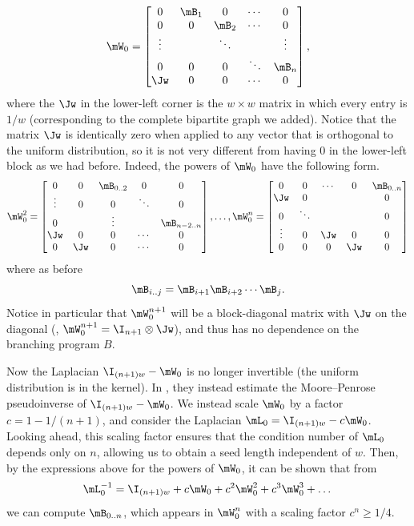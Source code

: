     \begin{equation}
        \mW_0 =
    \begin{bmatrix}
    0 & \mB_1 & 0 & \cdots & 0 \\
    0 & 0 & \mB_2 & \cdots & 0 \\
    \vdots & & \ddots & & \vdots\\
    0 & 0 & 0 & \ddots & \mB_n\\
    \Jw & 0 & 0 & \cdots &  0 \\
    \end{bmatrix}, \label{eqn:bWhat}
    \end{equation}
    where the $\Jw$ in the lower-left corner is the $w\times w$ matrix in which every entry is $1/w$ (corresponding to the complete bipartite graph we added).  Notice that the matrix $\Jw$ is identically zero when applied to any vector that is orthogonal to the uniform distribution, so it is not very different %
    from having $0$ in the lower-left block as we had before. Indeed, the powers of $\mW_0$ have the following form. %
    \begin{equation} \label{eqn:bWhatpowers} 
    \mW_0^2 =
    \begin{bmatrix}
    0 & 0 & \mB_{0..2} & 0 & 0 \\
    \vdots & 0 & 0 & \ddots & 0 \\
    0 & & \vdots & & \mB_{n-2..n}\\
    \Jw & 0 & 0 & \cdots & 0\\
    0& \Jw & 0 & \cdots &  0 \\
    \end{bmatrix}, \ldots,
    \mW_0^n =
    \begin{bmatrix}
    0 & 0 & \cdots & 0 & \mB_{0..n} \\
    \Jw & 0 &  &  & 0 \\
    0 & \ddots &  & & 0\\
    \vdots & 0 & \Jw & 0 & 0\\
    0& 0 & 0 & \Jw &  0 \\
    \end{bmatrix}
    \end{equation}
    where as before 
    $$\mB_{i..j} = \mB_{i+1}\mB_{i+2}\cdots \mB_j.$$
    Notice in particular that $\mW_0^{n+1}$ will be a block-diagonal
    matrix with %
    $\Jw$ %
on the diagonal (\ie, $\mW_0^{n+1}=\I_{n+1}\otimes \Jw$), and thus has no dependence on the branching program $B$.
    
    Now the Laplacian $\I_{(n+1)w}-\mW_0$ is no longer invertible (the uniform distribution is in the kernel).  In \cite{AhmadinejadKeMuPeSiVa19}, they instead estimate the Moore--Penrose pseudoinverse of $\I_{(n+1)w}-\mW_0$. We instead scale $\mW_0$ by a factor $c=1-1/(n+1)$, and consider the Laplacian $\mL_0=\I_{(n+1)w}-c\mW_0$. Looking ahead, this scaling factor ensures that the condition number of $\mL_0$ depends only on $n$, allowing us to obtain a seed length independent of $w$. Then, by the expressions above for the powers of $\mW_0$, it can be shown that from
    $$\mL^{-1}_0 = \I_{(n+1)w}+c\mW_0+c^2\mW_0^2+c^3\mW_0^3+\dots$$
    we can compute $\mB_{0..n}$, which appears in $\mW_0^n$ with a scaling factor $c^n\geq 1/4$.
   
